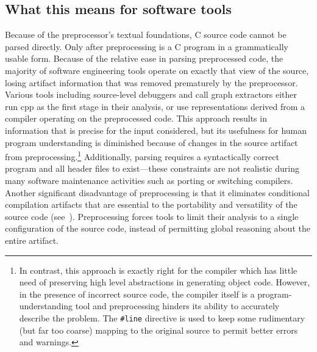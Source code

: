 \documentclass{article}
\newcommand{\Cpp}{\mbox{\textsf{cpp}}}
\newcommand{\C}{\mbox{C}}
\newcommand{\ppd}[1]{\texttt{\##1}}
\begin{document}

\subsection{What this means for software tools}

Because of the preprocessor's textual foundations, \C{} source code
cannot be parsed directly.  Only after preprocessing is a \C{}
program in a grammatically usable form. Because of the relative ease in
parsing preprocessed code, the majority of software engineering tools
operate on exactly that view of the source, losing artifact information
that was removed prematurely by the preprocessor.  Various tools including
source-level debuggers and call graph extractors
either run \Cpp{} as the first stage in their
analysis, or use representations derived from a compiler operating on
the preprocessed code.  This approach results in information that is
precise for the input considered, but its usefulness for human
program understanding is diminished because of changes in the source
artifact from preprocessing.\footnote{In contrast, this approach is
  exactly right for the compiler which has little need of preserving
  high level abstractions in generating object code.  However, in the
  presence of incorrect source code, the compiler itself is a
  program-understanding tool and preprocessing hinders its ability to
  accurately describe the problem.  The \ppd{line} directive is used to
  keep some rudimentary (but far too coarse) mapping to the original
  source to permit better errors and warnings.}  Additionally,
parsing requires a syntactically correct program and all header files to
exist---these constraints are not realistic during many software
maintenance activities such as porting or switching compilers.
Another significant disadvantage of preprocessing is that it eliminates
conditional compilation artifacts that are essential to the portability
and versatility of the source code (see~\cite{Krone94}).  Preprocessing
forces tools to limit their analysis to a single configuration of the
source code, instead of permitting global reasoning about the entire
artifact.

\end{document}
